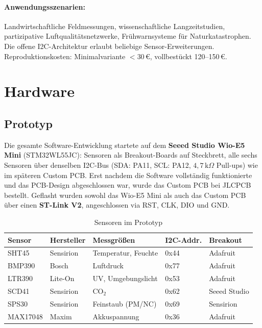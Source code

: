 \documentclass[11pt,a4paper]{scrartcl}
\begin{document}
\paragraph{Anwendungsszenarien:} Landwirtschaftliche Feldmessungen, wissenschaftliche Langzeitstudien, partizipative Luftqualitätsnetzwerke, Frühwarnsysteme für Naturkatastrophen. Die offene I2C-Architektur erlaubt beliebige Sensor-Erweiterungen. Reproduktionskosten: Minimal\-variante $< 30$\,€, vollbestückt 120–150\,€.

\section{Hardware}

\subsection*{Prototyp}

Die gesamte Software-Entwicklung startete auf dem \textbf{Seeed Studio Wio-E5 Mini} (STM32WL55JC): Sensoren als Breakout-Boards auf Steckbrett, alle sechs Sensoren über denselben I2C-Bus (SDA: PA11, SCL: PA12, $4{,}7\,\text{k}\Omega$ Pull-ups) wie im späteren Custom PCB. Erst nachdem die Software vollständig funktionierte und das PCB-Design abgeschlossen war, wurde das Custom PCB bei JLCPCB bestellt. Geflasht wurden sowohl das Wio-E5 Mini als auch das Custom PCB über einen \textbf{ST-Link V2}, angeschlossen via RST, CLK, DIO und GND.

\begin{table}[H]
  \centering
  \begin{tabular}{lllll}
    \hline
    \textbf{Sensor} & \textbf{Hersteller} & \textbf{Messgrößen} & \textbf{I2C-Addr.} & \textbf{Breakout} \\
    \hline
    SHT45    & Sensirion & Temperatur, Feuchte      & 0x44 & Adafruit \\
    BMP390   & Bosch     & Luftdruck                & 0x77 & Adafruit \\
    LTR390   & Lite-On   & UV, Umgebungslicht       & 0x53 & Adafruit \\
    SCD41    & Sensirion & CO$_2$                   & 0x62 & Seeed Studio \\
    SPS30    & Sensirion & Feinstaub (PM/NC)        & 0x69 & Sensirion \\
    MAX17048 & Maxim     & Akkuspannung             & 0x36 & Adafruit \\
    \hline
  \end{tabular}
  \caption{Sensoren im Prototyp}
\end{table}
\end{document}
